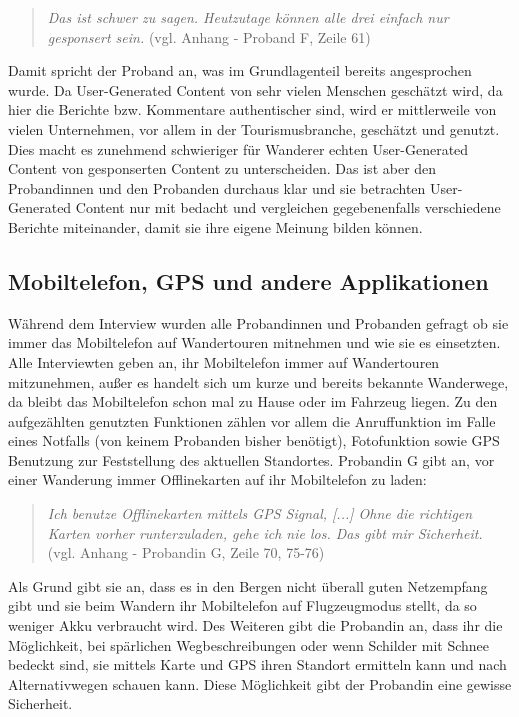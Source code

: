 \begin{quote}
	\textit{\glqq Das ist schwer zu sagen. Heutzutage können alle drei einfach nur gesponsert sein.\grqq} (vgl. Anhang - Proband F, Zeile 61)
\end{quote}

Damit spricht der Proband an, was im Grundlagenteil bereits angesprochen wurde. Da User-Generated Content von sehr vielen Menschen geschätzt wird, da hier die Berichte bzw. Kommentare authentischer sind, wird er mittlerweile von vielen Unternehmen, vor allem in  der Tourismusbranche, geschätzt und genutzt. Dies macht es zunehmend schwieriger für Wanderer \glqq echten{\grqq} User-Generated Content von gesponserten Content zu unterscheiden. Das ist aber den Probandinnen und den Probanden durchaus klar und sie betrachten User-Generated Content nur mit bedacht und vergleichen gegebenenfalls verschiedene Berichte miteinander, damit sie ihre eigene Meinung bilden können.

\subsection{Mobiltelefon, GPS und andere Applikationen}

Während dem Interview wurden alle Probandinnen und Probanden gefragt ob sie immer das Mobiltelefon auf Wandertouren mitnehmen und wie sie es einsetzten. Alle Interviewten geben an, ihr Mobiltelefon immer auf Wandertouren mitzunehmen, außer es handelt sich um kurze und bereits bekannte Wanderwege, da bleibt das Mobiltelefon schon mal zu Hause oder im Fahrzeug liegen. Zu den aufgezählten genutzten Funktionen zählen vor allem die Anruffunktion im Falle eines Notfalls (von keinem Probanden bisher benötigt), Fotofunktion sowie GPS Benutzung zur Feststellung des aktuellen Standortes. Probandin G gibt an, vor einer Wanderung immer Offlinekarten auf ihr Mobiltelefon zu laden:

\begin{quote}
	\textit{\glqq Ich benutze Offlinekarten mittels GPS Signal, [...] Ohne die richtigen Karten vorher runterzuladen, gehe ich nie los. Das gibt mir Sicherheit.\grqq} (vgl. Anhang - Probandin G, Zeile 70, 75-76)
\end{quote}

Als Grund gibt sie an, dass es in den Bergen nicht überall guten Netzempfang gibt und sie beim Wandern ihr Mobiltelefon auf Flugzeugmodus stellt, da so weniger Akku verbraucht wird. Des Weiteren gibt die Probandin an, dass ihr die Möglichkeit, bei spärlichen Wegbeschreibungen oder wenn Schilder mit Schnee bedeckt sind, sie mittels Karte und GPS ihren Standort ermitteln kann und nach Alternativwegen schauen kann. Diese Möglichkeit gibt der Probandin eine gewisse Sicherheit.

